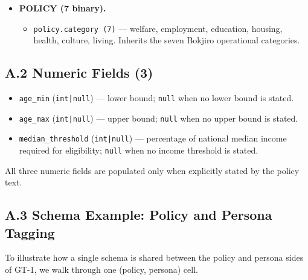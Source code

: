 \documentclass{article}
\begin{document}
\begin{itemize}[leftmargin=*]
\item \textbf{POLICY (7 binary).}
  \begin{itemize}[leftmargin=*,nosep]
  \item \texttt{policy.category (7)} --- welfare, employment,
        education, housing, health, culture, living. Inherits the
        seven Bokjiro operational categories.
  \end{itemize}
\end{itemize}

\subsection*{A.2 Numeric Fields (3)}

\begin{itemize}[leftmargin=*,nosep]
\item \texttt{age\_min} (\texttt{int|null}) --- lower bound;
      \texttt{null} when no lower bound is stated.
\item \texttt{age\_max} (\texttt{int|null}) --- upper bound;
      \texttt{null} when no upper bound is stated.
\item \texttt{median\_threshold} (\texttt{int|null}) --- percentage
      of national median income required for eligibility;
      \texttt{null} when no income threshold is stated.
\end{itemize}

All three numeric fields are populated only when explicitly stated
by the policy text.

\subsection*{A.3 Schema Example: Policy and Persona Tagging}

To illustrate how a single schema is shared between the policy and
persona sides of GT-1, we walk through one (policy, persona) cell.
\end{document}
